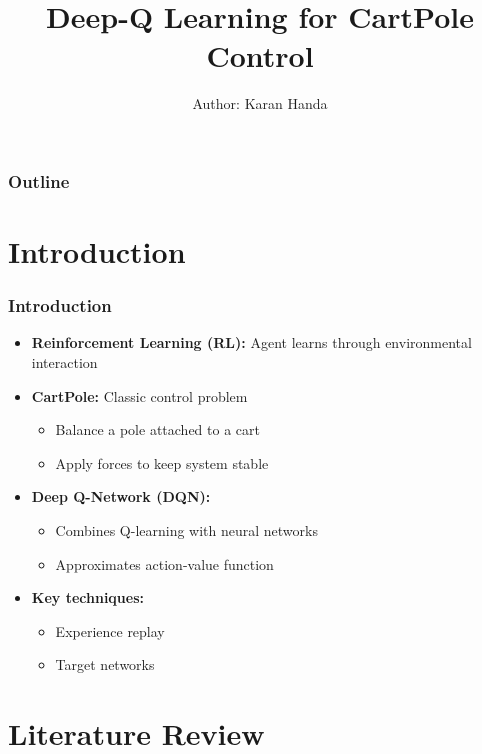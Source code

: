 \documentclass[
    9pt,
    aspectratio=169,
]{beamer}
\title[Deep-Q Learning for CartPole]{Deep-Q Learning for CartPole Control}
\author[Karan Handa]{Author: Karan Handa}
\institute[]{Computer Science \\ \smallskip \textit{karan.handa\_asp24@ashoka.edu.in}}
\date[Spring 2025\textbf{}]
\begin{document}
\begin{frame}
\titlepage
\end{frame}

\begin{frame}
\frametitle{Outline}
\tableofcontents
\end{frame}

\section{Introduction}

\begin{frame}
\frametitle{Introduction}
\begin{itemize}
    \item \textbf{Reinforcement Learning (RL):} Agent learns through environmental interaction
    \item \textbf{CartPole:} Classic control problem 
    \begin{itemize}
        \item Balance a pole attached to a cart
        \item Apply forces to keep system stable
    \end{itemize}
    \item \textbf{Deep Q-Network (DQN):} 
    \begin{itemize}
        \item Combines Q-learning with neural networks
        \item Approximates action-value function
    \end{itemize}
    \item \textbf{Key techniques:}
    \begin{itemize}
        \item Experience replay
        \item Target networks
    \end{itemize}
\end{itemize}
\end{frame}

\section{Literature Review}
\end{document}
